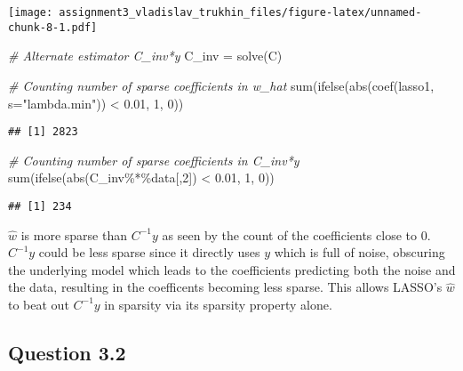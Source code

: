 \documentclass[
]{article}
\newenvironment{Shaded}{\begin{snugshade}}{\end{snugshade}}
\newcommand{\AttributeTok}[1]{\textcolor[rgb]{0.77,0.63,0.00}{#1}}
\newcommand{\CommentTok}[1]{\textcolor[rgb]{0.56,0.35,0.01}{\textit{#1}}}
\newcommand{\DecValTok}[1]{\textcolor[rgb]{0.00,0.00,0.81}{#1}}
\newcommand{\FloatTok}[1]{\textcolor[rgb]{0.00,0.00,0.81}{#1}}
\newcommand{\FunctionTok}[1]{\textcolor[rgb]{0.00,0.00,0.00}{#1}}
\newcommand{\NormalTok}[1]{#1}
\newcommand{\OtherTok}[1]{\textcolor[rgb]{0.56,0.35,0.01}{#1}}
\newcommand{\SpecialCharTok}[1]{\textcolor[rgb]{0.00,0.00,0.00}{#1}}
\newcommand{\StringTok}[1]{\textcolor[rgb]{0.31,0.60,0.02}{#1}}
\begin{document}
\texttt{[image: assignment3\_vladislav\_trukhin\_files/figure-latex/unnamed-chunk-8-1.pdf]}

\begin{Shaded}
\begin{Highlighting}[]
\CommentTok{\# Alternate estimator C\_inv*y}
\NormalTok{C\_inv }\OtherTok{=} \FunctionTok{solve}\NormalTok{(C)}

\CommentTok{\# Counting number of sparse coefficients in w\_hat}
\FunctionTok{sum}\NormalTok{(}\FunctionTok{ifelse}\NormalTok{(}\FunctionTok{abs}\NormalTok{(}\FunctionTok{coef}\NormalTok{(lasso1, }\AttributeTok{s=}\StringTok{"lambda.min"}\NormalTok{)) }\SpecialCharTok{\textless{}} \FloatTok{0.01}\NormalTok{, }\DecValTok{1}\NormalTok{, }\DecValTok{0}\NormalTok{))}
\end{Highlighting}
\end{Shaded}

\begin{verbatim}
## [1] 2823
\end{verbatim}

\begin{Shaded}
\begin{Highlighting}[]
\CommentTok{\# Counting number of sparse coefficients in C\_inv*y}
\FunctionTok{sum}\NormalTok{(}\FunctionTok{ifelse}\NormalTok{(}\FunctionTok{abs}\NormalTok{(C\_inv}\SpecialCharTok{\%*\%}\NormalTok{data[,}\DecValTok{2}\NormalTok{]) }\SpecialCharTok{\textless{}} \FloatTok{0.01}\NormalTok{, }\DecValTok{1}\NormalTok{, }\DecValTok{0}\NormalTok{))}
\end{Highlighting}
\end{Shaded}

\begin{verbatim}
## [1] 234
\end{verbatim}

\(\hat w\) is more sparse than \(C^{-1}y\) as seen by the count of the
coefficients close to 0. \(C^{-1}y\) could be less sparse since it
directly uses \(y\) which is full of noise, obscuring the underlying
model which leads to the coefficients predicting both the noise and the
data, resulting in the coefficents becoming less sparse. This allows
LASSO's \(\hat w\) to beat out \(C^{-1}y\) in sparsity via its sparsity
property alone.

\hypertarget{question-3.2}{%
\subsection{Question 3.2}\label{question-3.2}}
\end{document}
